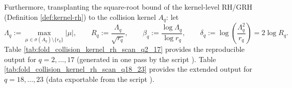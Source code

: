 
Furthermore, transplanting the square-root bound of the kernel-level RH/GRH (Definition \ref{def:kernel-rh}) to the collision kernel \(A_q\): let
\[
\Lambda_q:=\max_{\mu\in\sigma(A_q)\setminus\{r_q\}}|\mu|,
\qquad
R_q:=\frac{\Lambda_q}{\sqrt{r_q}},
\qquad
\beta_q:=\frac{\log \Lambda_q}{\log r_q},
\qquad
\delta_q:=\log\!\left(\frac{\Lambda_q^2}{r_q}\right)=2\log R_q.
\]
Table \ref{tab:fold_collision_kernel_rh_scan_q2_17} provides the reproducible output for \(q=2,\dots,17\) (generated in one pass by the script ).
Table \ref{tab:fold_collision_kernel_rh_scan_q18_23} provides the extended output for \(q=18,\dots,23\) (data exportable from the script ).



